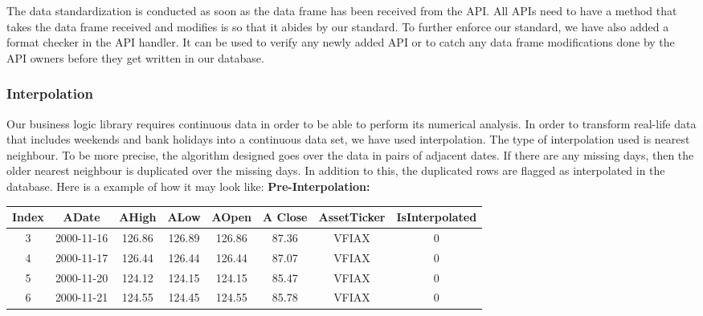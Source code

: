 \documentclass[main.tex]{subfiles}
\begin{document}
The data standardization is conducted as soon as the data frame has been received from the API. All APIs need to have a method that takes the data frame received and modifies is so that it abides by our standard. To further enforce our standard, we have also added a format checker in the API handler. It can be used to verify any newly added API or to catch any data frame modifications done by the API owners before they get written in our database.

\subsubsection{Interpolation}

Our business logic library requires continuous data in order to be able to perform its numerical analysis. In order to transform real-life data that includes weekends and bank holidays into a continuous data set, we have used interpolation. The type of interpolation used is nearest neighbour. To be more precise, the algorithm designed goes over the data in pairs of adjacent dates. If there are any missing days, then the older nearest neighbour is duplicated over the missing days. In addition to this, the duplicated rows are flagged as interpolated in the database. Here is a example of how it may look like:
\textbf{\newline Pre-Interpolation: }
\begin{center}
    \begin{tabular}{||c c c c c c c c||} 
        \hline
        Index & ADate & AHigh & ALow & AOpen &A Close&AssetTicker&IsInterpolated\\ [0.5ex] 
        \hline\hline
        3&2000-11-16&126.86&126.89&126.86&87.36&VFIAX&0 \\ 
        \hline
        4&2000-11-17&126.44&126.44&126.44&87.07&VFIAX&0\\
        \hline
        5&2000-11-20&124.12&124.15&124.15&85.47&VFIAX&0\\ 
        \hline
        6&2000-11-21&124.55&124.45&124.55&85.78&VFIAX&0\\
        \hline
    \end{tabular}
\end{center}
\end{document}
